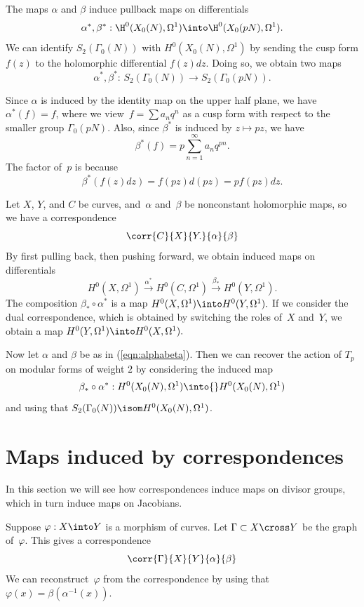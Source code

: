 \documentclass{report}
\begin{document}
The maps $\alpha$ and $\beta$ induce pullback maps on differentials
\[
  \alpha^{*},\beta^{*}: \H^0(X_0(N),\Omega^1)\into
                        \H^0(X_0(pN),\Omega^1).
\]
We can identify $S_2(\Gamma_0(N))$ with $H^0(X_0(N),\Omega^1)$ by
sending the cusp form $f(z)$ to the holomorphic differential
$f(z)dz$.   Doing so, we obtain two maps
\[
  \alpha^{*},\beta^{*}: \,S_2(\Gamma_0(N))\to{} S_2(\Gamma_0(pN)).
\]

Since $\alpha$ is induced by the identity map on the upper half
plane, we have $\alpha^{*}(f)=f$, where we view~$f=\sum a_nq^n$ as
a cusp form with respect to the smaller group $\Gamma_0(pN)$.
Also, since $\beta^*$ is induced by $z\mapsto pz$, we have
\[
   \beta^{*}(f)= p\sum_{n=1}^{\infty}a_n{}q^{pn}.
\]
The factor of~$p$ is because
\[
  \beta^*(f(z) dz) = f(pz) d(pz) = p f(pz) dz.
\]

Let $X$, $Y$, and $C$ be curves, and~$\alpha$ and~$\beta$ be
nonconstant holomorphic maps, so we have a correspondence
\[
 \corr{C}{X}{Y.}{\alpha}{\beta}
\]
By first pulling back, then pushing forward, we obtain induced
maps on differentials
\[
  H^0(X,\Omega^1)\xrightarrow{\alpha^{*}}H^0(C,\Omega^1)
                  \xrightarrow{\beta_{*}}H^0(Y,\Omega^1).
\]
The composition $\beta_{*}\circ\alpha^{*}$ is a map
$H^0(X,\Omega^1)\into H^0(Y,\Omega^1).$
If we consider the dual correspondence, which is obtained
by switching the roles of~$X$ and~$Y$, we obtain a map
$H^0(Y,\Omega^1)\into H^0(X,\Omega^1).$

Now let $\alpha$ and $\beta$ be as in (\ref{eqn:alphabeta}).
Then we can recover the action of $T_p$ on modular forms of weight $2$
by considering the induced map
\[
  \beta_*\circ\alpha^*:H^0(X_0(N),\Omega^1)
            \into{}H^0(X_0(N),\Omega^1)
\]
and using that $S_2(\Gamma_0(N))\isom H^0(X_0(N),\Omega^1)$.


\section{Maps induced by correspondences}
In this section we will see how correspondences induce maps
on divisor groups, which in turn induce maps on Jacobians.

Suppose $\varphi:X\into Y$ is a morphism of curves. Let
$\Gamma\subset X\cross Y$ be the graph of~$\varphi$. This gives a
correspondence
\[\corr{\Gamma}{X}{Y}{\alpha}{\beta}\]
We can reconstruct~$\varphi$ from the correspondence by
using that $\varphi(x)=\beta(\alpha^{-1}(x))$.
\end{document}
